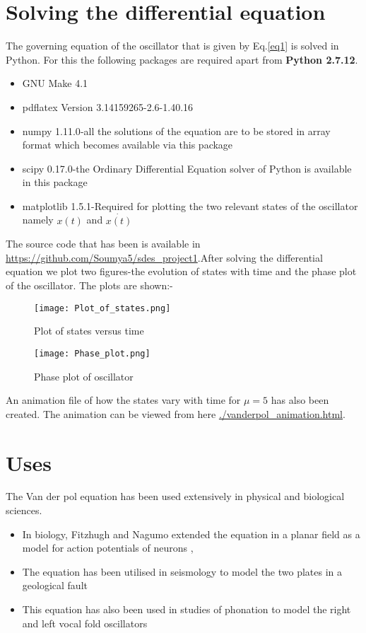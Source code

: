 \documentclass[a4paper]{article}
\begin{document}
\section{Solving the differential equation}
The governing equation of the oscillator that is given by Eq.\ref{eq1} is solved in Python. For this the following packages are required 
apart from \textbf{Python 2.7.12}.
\begin{itemize}
    \item{GNU Make 4.1}
    \item{pdflatex Version 3.14159265-2.6-1.40.16} 
    \item{numpy 1.11.0}-all the solutions of the equation are to be stored in array format which becomes available via this package
    \item{scipy 0.17.0}-the Ordinary Differential Equation solver of Python is available in this package
    \item{matplotlib 1.5.1}-Required for plotting the two relevant states of the oscillator namely $x(t)$ and $\dot{x(t)}$
\end{itemize}
The source code that has been is available in \url{https://github.com/Soumya5/sdes_project1}.After solving the differential equation we plot two figures-the evolution of states with time and the phase plot of the oscillator. The plots are shown:-
\begin{figure}[H]
    \centering
    \texttt{[image: Plot\_of\_states.png]}
    \caption{Plot of states versus time}
\end{figure}
\begin{figure}[H]
    \centering
    \texttt{[image: Phase\_plot.png]}
    \caption{Phase plot of oscillator}
\end{figure}
An animation file of how the states vary with time for $\mu=5$ has also been created. The animation can be viewed from here \url{./vanderpol_animation.html}.
\section{Uses}
The Van der pol equation has been used extensively in physical and biological sciences.
\begin{itemize}
    \item In biology, Fitzhugh and Nagumo extended the equation in a planar field as a model for action potentials of neurons \cite{fitz}, \cite{nagumo1962}
    \item The equation has been utilised in seismology to model the two plates in a geological fault \cite{seis}
    \item This equation has also been used in studies of phonation to model the right and left vocal fold oscillators \cite{phonation}
\end{itemize}
{}

\end{document}
